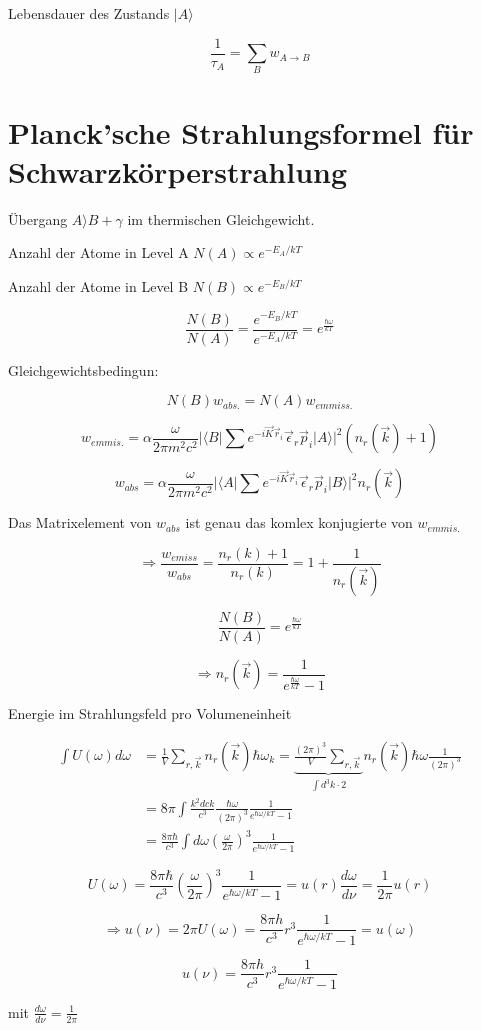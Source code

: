 Lebensdauer des Zustands \(|A\rangle \)

\[\boxed{\frac{1}{\tau_A} = \sum_B w_{A\to B}}\]


\section{Planck'sche Strahlungsformel für Schwarzkörperstrahlung}


Übergang \(A\rangle B+\gamma\) im thermischen Gleichgewicht. 

Anzahl der Atome in Level A \(N(A)\propto e^{-E_A/kT}\)

Anzahl der Atome in Level B \(N(B)\propto e^{-E_B/kT}\)

\[\frac{N(B)}{N(A)} = \frac{e^{-E_B/kT}}{e^{-E_A/kT}} = e^{\frac{\hbar \omega}{kT}}\]

Gleichgewichtsbedingun:

\[N(B) w_{abs.} = N(A)w_{emmiss.}\]


\[w_{emmis.} = \alpha \frac{\omega}{2\pi m^2c^2}|\langle B|\sum e^{-i\vec K\vec r_i}\vec \epsilon_r\vec p_i|A\rangle |^2(n_r(\vec k)+1)\]

\[w_{abs} = \alpha \frac{\omega}{2\pi m^2c^2}|\langle A|\sum e^{-i\vec K\vec r_i}\vec \epsilon_r\vec p_i|B\rangle |^2n_r(\vec k)\]

Das Matrixelement von \(w_{abs}\) ist genau das komlex konjugierte von \(w_{emmis.}\)

\[\Rightarrow \frac{w_{emiss}}{w_{abs}} = \frac{n_r(k)+1}{n_r(k)} = 1+\frac{1}{n_r(\vec k)}\]

\[\frac{N(B)}{N(A)} = e^{\frac{\hbar\omega}{kT}}\]


\[\Rightarrow \boxed{n_r(\vec k) = \frac{1}{e^{\frac{\hbar\omega}{kT}}-1} } \]


Energie im Strahlungsfeld pro Volumeneinheit

\begin{align}
\int U(\omega)d\omega &= \frac{1}{V} \sum_{r,\vec k}n_r(\vec k) \hbar \omega_k = \underbrace{\frac{(2\pi)^3}{V}\sum_{r,\vec k}}_{\int d^3 k\cdot 2}  n_r(\vec k)\hbar\omega \frac{1}{(2\pi)^3}\\
&=8\pi \int \frac{k^2 dck}{c^3}\frac{\hbar\omega}{(2\pi)^3}\frac{1}{e^{\hbar\omega/kT}-1}\\
&= \frac{8\pi\hbar}{c^3}\int d\omega (\frac{\omega}{2\pi})^3 \frac{1}{e^{\hbar\omega/kT}-1}
\end{align}


\[U(\omega) = \frac{8\pi\hbar}{c^3} (\frac{\omega}{2\pi})^3 \frac{1}{e^{\hbar\omega/kT}-1} = u(r) \frac{d\omega}{d\nu} = \frac{1}{2\pi}u(r) \]

\[\Rightarrow u(\nu) = 2\pi U(\omega) = \frac{8\pi h}{c^3} r^3 \frac{1}{e^{\hbar\omega/kT}-1} = u(\omega) \]

\[\boxed{ u(\nu)= \frac{8\pi h}{c^3} r^3 \frac{1}{e^{\hbar\omega/kT}-1}  }  \]

mit \(\frac{d\omega}{d\nu} = \frac{1}{2\pi}\)



